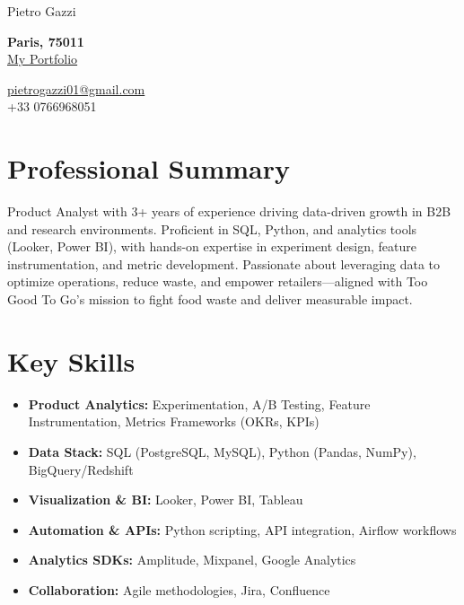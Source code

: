 \documentclass[letterpaper,10.5pt]{article}
\begin{document}
\begin{center}\vspace{-10pt}
{\LARGE Pietro Gazzi}\vspace{-11pt}
\begin{multicols}{2}
\begin{flushleft}
\textbf{Paris, 75011}\\
\href{https://pietrowei.github.io/Portfolio}{\underline{My Portfolio}}
\end{flushleft}
\begin{flushright}
\href{mailto:pietrogazzi01@gmail.com}{pietrogazzi01@gmail.com}\\
+33 0766968051
\end{flushright}
\end{multicols}
\end{center}

\section*{Professional Summary}
Product Analyst with 3+ years of experience driving data-driven growth in B2B and research environments. Proficient in SQL, Python, and analytics tools (Looker, Power BI), with hands-on expertise in experiment design, feature instrumentation, and metric development. Passionate about leveraging data to optimize operations, reduce waste, and empower retailers—aligned with Too Good To Go’s mission to fight food waste and deliver measurable impact.

\section*{Key Skills}
\begin{multicols}{2}
\begin{itemize}[leftmargin=0.2in]
\item \textbf{Product Analytics:} Experimentation, A/B Testing, Feature Instrumentation, Metrics Frameworks (OKRs, KPIs)
\item \textbf{Data Stack:} SQL (PostgreSQL, MySQL), Python (Pandas, NumPy), BigQuery/Redshift
\item \textbf{Visualization & BI:} Looker, Power BI, Tableau
\item \textbf{Automation & APIs:} Python scripting, API integration, Airflow workflows
\item \textbf{Analytics SDKs:} Amplitude, Mixpanel, Google Analytics
\item \textbf{Collaboration:} Agile methodologies, Jira, Confluence
\end{itemize}
\end{multicols}
\end{document}
